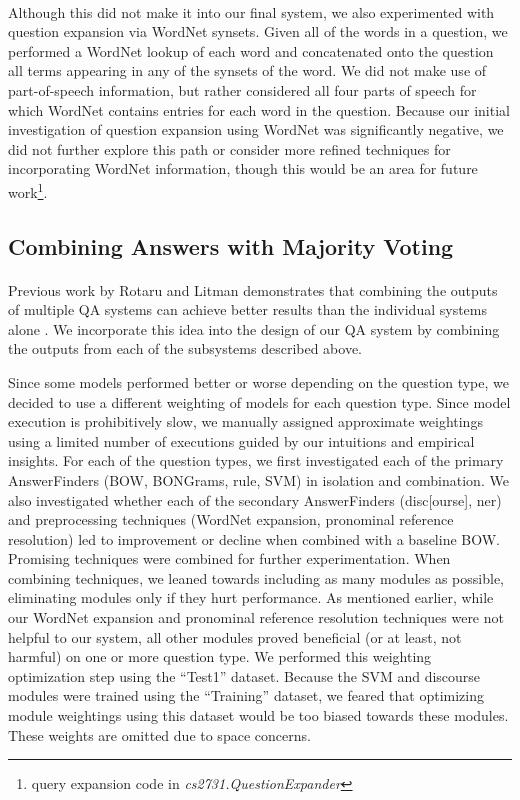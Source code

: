\documentclass[11pt,letterpaper]{article}
\begin{document}
\paragraph{}

Although this did not make it into our final system, we also experimented with question expansion via WordNet synsets. Given all of the words in a question, we performed a WordNet lookup of each word and concatenated onto the question all terms appearing in any of the synsets of the word. We did not make use of part-of-speech information, but rather considered all four parts of speech for which WordNet contains entries for each word in the question. Because our initial investigation of question expansion using WordNet was significantly negative, we did not further explore this path or consider more refined techniques for incorporating WordNet information, though this would be an area for future work\footnote{query expansion code in \textit{cs2731.QuestionExpander}}.




\subsection{Combining Answers with Majority Voting}
\paragraph{}
Previous work by Rotaru and Litman demonstrates that combining
the outputs of multiple QA systems can achieve better results than the
individual systems alone \cite{rotaru2005}. We incorporate this idea
into the design of our QA system by combining the outputs from each of
the subsystems described above.

Since some models performed better or worse depending on the question type, we decided to use a different weighting of models for each question type. Since model execution is prohibitively slow, we manually assigned approximate weightings using a limited number of executions guided by our intuitions and empirical insights. For each of the question types, we first investigated each of the primary AnswerFinders (BOW, BONGrams, rule, SVM) in isolation and combination. We also investigated whether each of the secondary AnswerFinders (disc[ourse], ner) and preprocessing techniques (WordNet expansion, pronominal reference resolution) led to improvement or decline when combined with a baseline BOW. Promising techniques were combined for further experimentation. When combining techniques, we leaned towards including as many modules as possible, eliminating modules only if they hurt performance. As mentioned earlier, while our WordNet expansion and pronominal reference resolution techniques were not helpful to our system, all other modules proved beneficial (or at least, not harmful) on one or more question type. We performed this weighting optimization step using the ``Test1'' dataset. Because the SVM and discourse modules were trained using the ``Training'' dataset, we feared that optimizing module weightings using this dataset would be too biased towards these modules. These weights are omitted due to space concerns.
\end{document}
